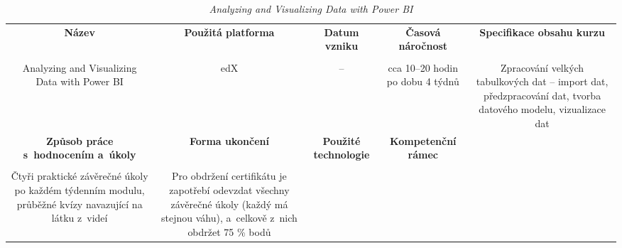 \begin{landscape}

\begin{table}[htbp]

\renewcommand\thetable{6}

\caption{\textit{Analyzing and Visualizing Data with Power BI}}\label{tab5}

\footnotesize

{

\justifying

\begin{tabularx}{\linewidth}{CCCCC}

\toprule

\textbf{Název} &

\textbf{Použitá platforma} &

\textbf{Datum vzniku} &

\textbf{Časová náročnost} &
 
\textbf{Specifikace obsahu kurzu}

\\

\tabularnewline
\midrule

Analyzing and Visualizing Data with Power BI

&

edX

&

–

&

cca 10–20 hodin po dobu 4 týdnů

&

Zpracování velkých tabulkových dat – import dat, předzpracování dat, tvorba datového modelu, vizualizace dat

\\
\toprule

\textbf{Způsob práce s~hodnocením a~úkoly} &

\textbf{Forma ukončení} &

\textbf{Použité technologie} &

\textbf{Kompetenční rámec} 

\\

\tabularnewline
\midrule

Čtyři praktické závěrečné úkoly po každém týdenním modulu, průběžné kvízy navazující na látku z~videí 

&

Pro obdržení certifikátu je zapotřebí odevzdat všechny závěrečné úkoly (každý má stejnou váhu), a~celkově z~nich obdržet 75 \% bodů


\end{tabularx}}
\end{table}
\end{landscape}
